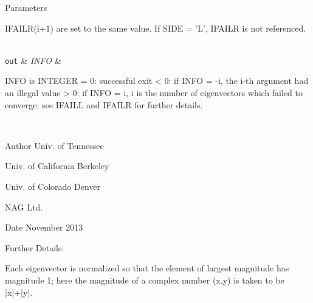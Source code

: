 \begin{DoxyParams}[1]{Parameters}
\begin{DoxyVerb}
          IFAILR(i+1) are set to the same value.
          If SIDE = 'L', IFAILR is not referenced.\end{DoxyVerb}
\\
\hline
\mbox{\tt out}  & {\em I\+N\+F\+O} & \begin{DoxyVerb}          INFO is INTEGER
          = 0:  successful exit
          < 0:  if INFO = -i, the i-th argument had an illegal value
          > 0:  if INFO = i, i is the number of eigenvectors which
                failed to converge; see IFAILL and IFAILR for further
                details.\end{DoxyVerb}
 \\
\hline
\end{DoxyParams}
\begin{DoxyAuthor}{Author}
Univ. of Tennessee 

Univ. of California Berkeley 

Univ. of Colorado Denver 

N\+A\+G Ltd. 
\end{DoxyAuthor}
\begin{DoxyDate}{Date}
November 2013 
\end{DoxyDate}
\begin{DoxyParagraph}{Further Details\+: }
\begin{DoxyVerb}  Each eigenvector is normalized so that the element of largest
  magnitude has magnitude 1; here the magnitude of a complex number
  (x,y) is taken to be |x|+|y|.\end{DoxyVerb}
 
\end{DoxyParagraph}
